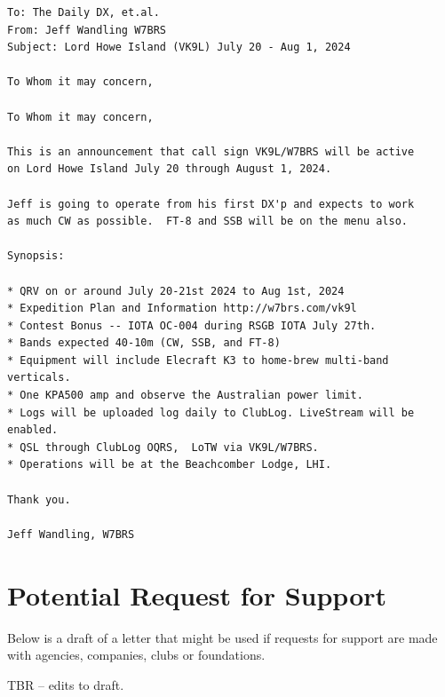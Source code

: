 \documentclass[11pt]{article}
\begin{document}
\begin{Verbatim}[fontsize=\small]
To: The Daily DX, et.al.
From: Jeff Wandling W7BRS
Subject: Lord Howe Island (VK9L) July 20 - Aug 1, 2024

To Whom it may concern,

To Whom it may concern,

This is an announcement that call sign VK9L/W7BRS will be active
on Lord Howe Island July 20 through August 1, 2024.

Jeff is going to operate from his first DX'p and expects to work
as much CW as possible.  FT-8 and SSB will be on the menu also.

Synopsis:

* QRV on or around July 20-21st 2024 to Aug 1st, 2024
* Expedition Plan and Information http://w7brs.com/vk9l
* Contest Bonus -- IOTA OC-004 during RSGB IOTA July 27th.
* Bands expected 40-10m (CW, SSB, and FT-8)
* Equipment will include Elecraft K3 to home-brew multi-band verticals.
* One KPA500 amp and observe the Australian power limit.
* Logs will be uploaded log daily to ClubLog. LiveStream will be enabled.
* QSL through ClubLog OQRS,  LoTW via VK9L/W7BRS.
* Operations will be at the Beachcomber Lodge, LHI.

Thank you.

Jeff Wandling, W7BRS
\end{Verbatim}

\section{Potential Request for Support}

Below is a draft of a letter that might be used if
requests for support are made with agencies, companies,
clubs or foundations.

\par
TBR -- edits to draft.
\par
\end{document}
